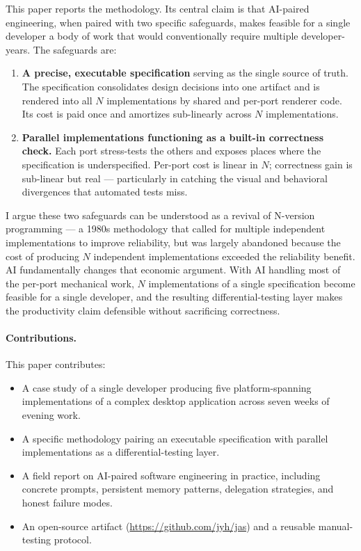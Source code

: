\documentclass[10pt]{article}
\begin{document}
This paper reports the methodology. Its central claim is that AI-paired
engineering, when paired with two specific safeguards, makes feasible for a
single developer a body of work that would conventionally require multiple
developer-years. The safeguards are:

\begin{enumerate}[leftmargin=*]
\item \textbf{A precise, executable specification} serving as the single
  source of truth. The specification consolidates design decisions into
  one artifact and is rendered into all $N$ implementations by shared and
  per-port renderer code. Its cost is paid once and amortizes sub-linearly
  across $N$ implementations.
\item \textbf{Parallel implementations functioning as a built-in correctness
  check.} Each port stress-tests the others and exposes places where the
  specification is underspecified. Per-port cost is linear in $N$;
  correctness gain is sub-linear but real --- particularly in catching the
  visual and behavioral divergences that automated tests miss.
\end{enumerate}

I argue these two safeguards can be understood as a revival of N-version
programming \citep{avizienis1985nversion} --- a 1980s methodology that
called for multiple independent implementations to improve reliability, but
was largely abandoned because the cost of producing $N$ independent
implementations exceeded the reliability benefit. AI fundamentally changes
that economic argument. With AI handling most of the per-port mechanical
work, $N$ implementations of a single specification become feasible for a
single developer, and the resulting differential-testing layer makes the
productivity claim defensible without sacrificing correctness.

\paragraph{Contributions.} This paper contributes:
\begin{itemize}[leftmargin=*]
\item A case study of a single developer producing five platform-spanning
  implementations of a complex desktop application across seven weeks of
  evening work.
\item A specific methodology pairing an executable specification with
  parallel implementations as a differential-testing layer.
\item A field report on AI-paired software engineering in practice,
  including concrete prompts, persistent memory patterns, delegation
  strategies, and honest failure modes.
\item An open-source artifact (\url{https://github.com/jyh/jas}) and a
  reusable manual-testing protocol.
\end{itemize}
\end{document}
